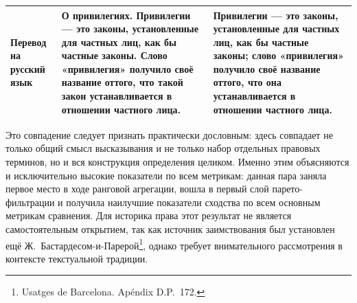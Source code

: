 \begin{center}
\begin{longtable}{|p{}|p{}|p{}|}
\textbf{Перевод на русский язык} & \textbf{О привилегиях.} Привилегии --- это законы, установленные для частных лиц, как бы частные законы. Слово «привилегия» получило своё название оттого, что такой закон устанавливается в отношении частного лица. & Привилегии --- это законы, установленные для частных лиц, как бы частные законы; слово «привилегия» получило своё название оттого, что она устанавливается в отношении частного лица. \\ \hline
\end{longtable}
\end{center}

Это совпадение следует признать практически дословным: здесь совпадает не только общий смысл высказывания и не только набор отдельных правовых терминов, но и вся конструкция определения целиком. Именно этим объясняются и исключительно высокие показатели по всем метрикам: данная пара заняла первое место в ходе ранговой агрегации, вошла в первый слой парето-фильтрации и получила наилучшие показатели сходства по всем основным метрикам сравнения. Для историка права этот результат не является самостоятельным открытием, так как источник заимствования был установлен ещё Ж.~Бастардесом-и-Парерой\footnote{Usatges de Barcelona. Apéndix D.P.~172.}, однако требует внимательного рассмотрения в контексте текстуальной традиции.

